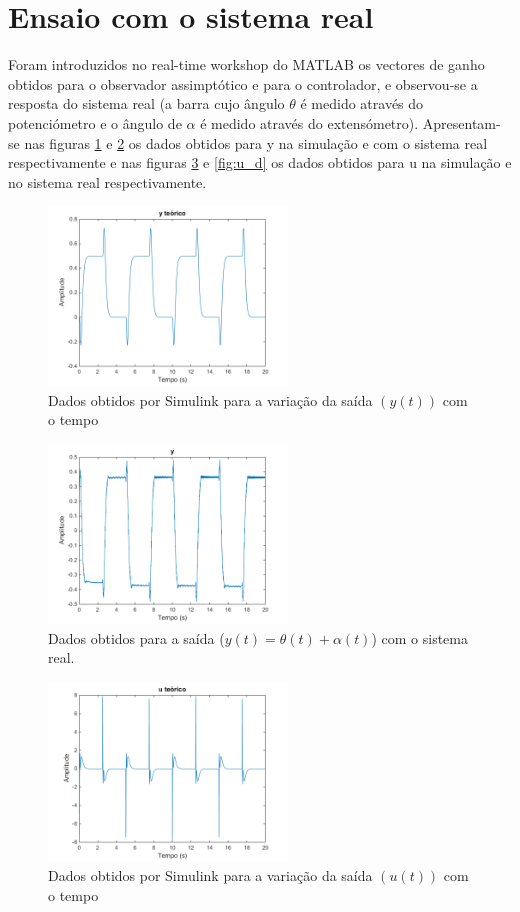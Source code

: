 \documentclass[%
  reprint,
  nofootinbib,
  amsmath,amssymb,
  aps,
  10pt,
  a4paper
]{revtex4-1}
\begin{document}
\section{Ensaio com o sistema real}
Foram introduzidos no real-time workshop do MATLAB os vectores de ganho obtidos para o observador assimptótico e para o controlador, e observou-se a resposta do sistema real (a barra cujo ângulo $\theta$ é medido através do potenciómetro e o ângulo de $\alpha$ é medido através do extensómetro). Apresentam-se nas figuras \ref{fig:y_t} e \ref{fig:y_d} os dados obtidos para y na simulação e com o sistema real respectivamente e nas figuras \ref{fig:u_t} e \ref{fig:u_d} os dados obtidos para u na simulação e no sistema real respectivamente.
\begin{figure}
\includegraphics[width=2.5in]{../img/y.png}
\caption{Dados obtidos por Simulink para a variação da saída $(y(t))$ com o tempo}
\label{fig:y_t}
\end{figure}
\begin{figure}
\includegraphics[width=2.5in]{../img/y_dados_01.png}
\caption{Dados obtidos para a saída ($y(t)=\theta(t)+\alpha(t)$) com o sistema real.}
\label{fig:y_d}
\end{figure}
\begin{figure}
\includegraphics[width=2.5in]{../img/u.png}
\caption{Dados obtidos por Simulink para a variação da saída $(u(t))$ com o tempo}
\label{fig:u_t}
\end{figure}
\end{document}
